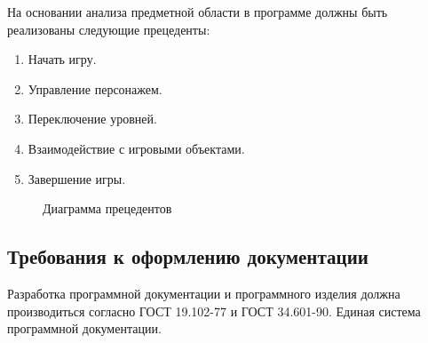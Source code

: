 На основании анализа предметной области в программе должны быть реализованы следующие прецеденты:
\begin{enumerate}
\item Начать игру.
\item Управление персонажем.
\item Переключение уровней.
\item Взаимодействие с игровыми объектами.
\item Завершение игры.
\end{enumerate}

\begin{figure}[ht]
	\caption{Диаграмма прецедентов}
	\label{precend:image}
\end{figure}

\subsection{Требования к оформлению документации}

Разработка программной документации и программного изделия должна производиться согласно ГОСТ 19.102-77 и ГОСТ 34.601-90. Единая система программной документации.
